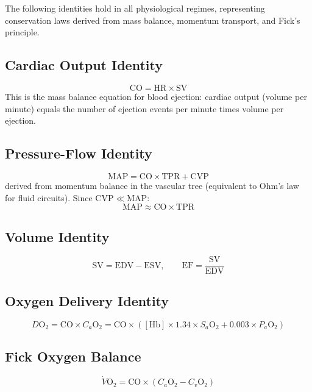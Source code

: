 \documentclass[12pt,a4paper]{article}
\theoremstyle{remark}
\newcommand{\CO}{\mathrm{CO}}
\newcommand{\SV}{\mathrm{SV}}
\newcommand{\HR}{\mathrm{HR}}
\newcommand{\MAP}{\mathrm{MAP}}
\newcommand{\TPR}{\mathrm{TPR}}
\newcommand{\CVP}{\mathrm{CVP}}
\newcommand{\EDV}{\mathrm{EDV}}
\newcommand{\ESV}{\mathrm{ESV}}
\newcommand{\EF}{\mathrm{EF}}
\begin{document}
The following identities hold in all physiological regimes, representing conservation laws derived from mass balance, momentum transport, and Fick's principle.

\subsection{Cardiac Output Identity}
\begin{equation}
    \boxed{\CO = \HR \times \SV}
    \label{eq:co_identity}
\end{equation}
This is the mass balance equation for blood ejection: cardiac output (volume per minute) equals the number of ejection events per minute times volume per ejection.

\subsection{Pressure-Flow Identity}
\begin{equation}
    \boxed{\MAP = \CO \times \TPR + \CVP}
    \label{eq:pressure_flow}
\end{equation}
derived from momentum balance in the vascular tree (equivalent to Ohm's law for fluid circuits). Since $\CVP \ll \MAP$:
\begin{equation}
    \MAP \approx \CO \times \TPR
    \label{eq:pressure_flow_approx}
\end{equation}

\subsection{Volume Identity}
\begin{equation}
    \boxed{\SV = \EDV - \ESV, \qquad \EF = \frac{\SV}{\EDV}}
    \label{eq:volume_identity}
\end{equation}

\subsection{Oxygen Delivery Identity}
\begin{equation}
    \boxed{D\mathrm{O}_2 = \CO \times C_a\mathrm{O}_2 = \CO \times \left([\mathrm{Hb}] \times 1.34 \times S_a\mathrm{O}_2 + 0.003 \times P_a\mathrm{O}_2\right)}
    \label{eq:do2}
\end{equation}

\subsection{Fick Oxygen Balance}
\begin{equation}
    \boxed{\dot{V}\mathrm{O}_2 = \CO \times (C_a\mathrm{O}_2 - C_v\mathrm{O}_2)}
    \label{eq:fick}
\end{equation}
\end{document}
